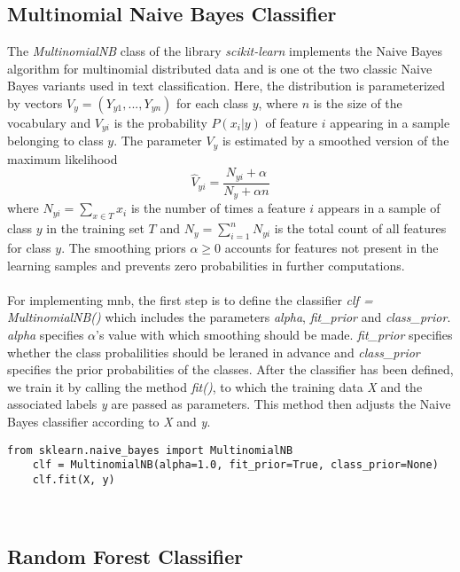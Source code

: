 \documentclass[a4paper, 11pt,titlepage,oneside,openany]{book}
\begin{document}
\subsection{Multinomial Naive Bayes Classifier}
The \textit{MultinomialNB} class of the library \textit{scikit-learn} implements the Naive Bayes algorithm for multinomial distributed data and is one ot the two classic Naive Bayes variants  used in text classification. Here, the distribution is parameterized by vectors $V_y=(Y_{y1},...,Y_{yn})$ for each class $y$, where $n$ is the size of the vocabulary and $V_{yi}$ is the probability $P(x_i|y)$ of feature $i$ appearing in a sample belonging to class $y$. The parameter $V_y$ is estimated by a smoothed version of the maximum likelihood
\[
	\hat{V}_{yi}=\frac{N_{yi}+\alpha}{N_y + \alpha n}
\]
where $N_{yi}=\sum_{x \in T}x_i$ is the number of times a feature $i$ appears in a sample of class $y$ in the training set $T$ and $N_y=\sum_{i=1}^{n}N_{yi}$ is the total count of all features for class $y$. The smoothing priors $\alpha \ge 0$ accounts for features not present in the learning samples and prevents zero probabilities in further computations. \\
\\ For implementing \gls{mnb}, the first step is to define the classifier \textit{clf = MultinomialNB()} which includes the parameters \textit{alpha}, \textit{fit\_prior} and \textit{class\_prior}. \textit{alpha} specifies $\alpha$'s value with which smoothing should be made. \textit{fit\_prior} specifies  whether the class probalilities should be leraned in advance and \textit{class\_prior} specifies the prior probabilities of the classes. After the classifier has been defined, we train it by calling the method \textit{fit()}, to which the training data \textit{X} and the associated labels \textit{y} are passed as parameters. This method then adjusts the Naive Bayes classifier according to \textit{X} and \textit{y}. \\
\noindent
\begin{minipage}{\linewidth}
	\begin{lstlisting}[frame=single]
	from sklearn.naive_bayes import MultinomialNB
	clf = MultinomialNB(alpha=1.0, fit_prior=True, class_prior=None)
	clf.fit(X, y)
	\end{lstlisting}
\end{minipage} \\
\subsection{Random Forest Classifier}
\end{document}
